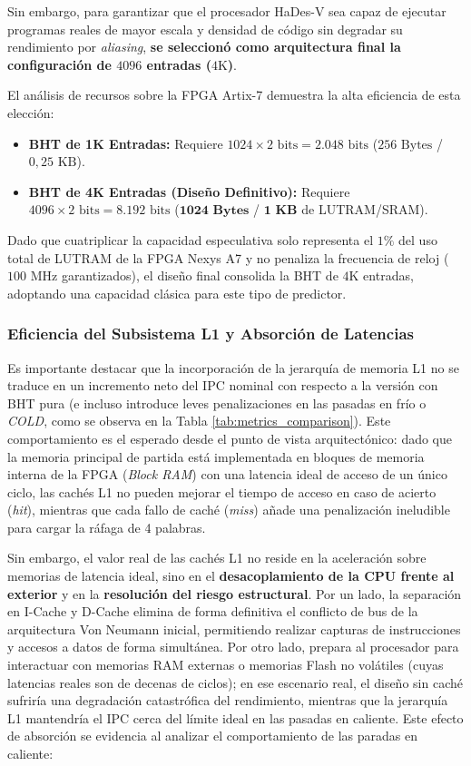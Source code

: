 \documentclass[10pt,a4paper]{article}
\begin{document}
Sin embargo, para garantizar que el procesador HaDes-V sea capaz de ejecutar programas reales de mayor escala y densidad de código sin degradar su rendimiento por 
\textit{aliasing}, \textbf{se seleccionó como arquitectura final la configuración de $4096$ entradas ($4\text{K}$)}.

El análisis de recursos sobre la FPGA Artix-7 demuestra la alta eficiencia de esta elección:
\begin{itemize}
    \item \textbf{BHT de 1K Entradas:} Requiere $1024 \times 2 \text{ bits} = 2.048 \text{ bits}$ ($256\text{ Bytes}$ / $0,25\text{ KB}$).
    \item \textbf{BHT de 4K Entradas (Diseño Definitivo):} Requiere $4096 \times 2 \text{ bits} = 8.192 \text{ bits}$ ($\mathbf{1024\text{ Bytes}}$ 
    / $\mathbf{1\text{ KB}}$ de LUTRAM/SRAM).
\end{itemize}

Dado que cuatriplicar la capacidad especulativa solo representa el $1\%$ del uso total de LUTRAM de la FPGA Nexys A7 y no penaliza la frecuencia de reloj 
($100\text{ MHz}$ garantizados), el diseño final consolida la BHT de $4\text{K}$ entradas, adoptando una capacidad clásica para este tipo de predictor.

\subsubsection{Eficiencia del Subsistema L1 y Absorción de Latencias}
Es importante destacar que la incorporación de la jerarquía de memoria L1 no se traduce en un incremento neto del IPC nominal con respecto a la versión con BHT pura 
(e incluso introduce leves penalizaciones en las pasadas en frío o \textit{COLD}, como se observa en la Tabla \ref{tab:metrics_comparison}). Este comportamiento es 
el esperado desde el punto de vista arquitectónico: dado que la memoria principal de partida está implementada en bloques de memoria interna de la FPGA 
(\textit{Block RAM}) con una latencia ideal de acceso de un único ciclo, las cachés L1 no pueden mejorar el tiempo de acceso en caso de acierto (\textit{hit}), 
mientras que cada fallo de caché (\textit{miss}) añade una penalización ineludible para cargar la ráfaga de 4 palabras.

Sin embargo, el valor real de las cachés L1 no reside en la aceleración sobre memorias de latencia ideal, sino en el \textbf{desacoplamiento de la CPU frente al 
exterior} y en la \textbf{resolución del riesgo estructural}. Por un lado, la separación en I-Cache y D-Cache elimina de forma definitiva el conflicto de bus de 
la arquitectura Von Neumann inicial, permitiendo realizar capturas de instrucciones y accesos a datos de forma simultánea. Por otro lado, prepara al procesador para 
interactuar con memorias RAM externas o memorias Flash no volátiles (cuyas latencias reales son de decenas de ciclos); en ese escenario real, el diseño sin caché 
sufriría una degradación catastrófica del rendimiento, mientras que la jerarquía L1 mantendría el IPC cerca del límite ideal en las pasadas en caliente. Este efecto 
de absorción se evidencia al analizar el comportamiento de las paradas en caliente:
\end{document}
